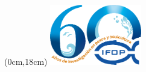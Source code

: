 \begin{textblock*}{5cm}(0cm,18cm)
  \includegraphics[width=4cm]{imagenes/logoifop60.png}
\end{textblock*}



\thispagestyle{empty}

\newpage
\thispagestyle{fancy} %
\setcounter{page}{1} %

